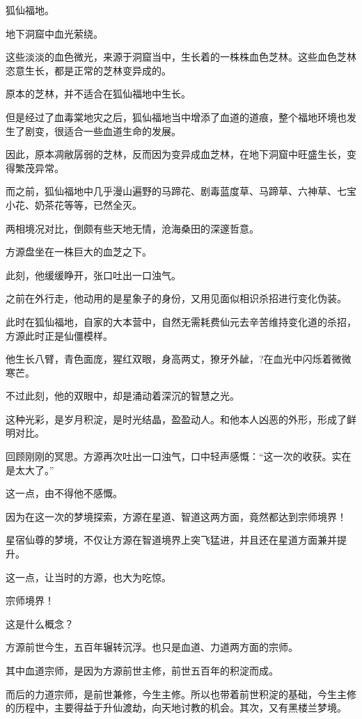 
\begin{this_body}

狐仙福地。

地下洞窟中血光萦绕。

这些淡淡的血色微光，来源于洞窟当中，生长着的一株株血色芝林。这些血色芝林恣意生长，都是正常的芝林变异成的。

原本的芝林，并不适合在狐仙福地中生长。

但是经过了血毒棠地灾之后，狐仙福地当中增添了血道的道痕，整个福地环境也发生了剧变，很适合一些血道生命的发展。

因此，原本凋敝孱弱的芝林，反而因为变异成血芝林，在地下洞窟中旺盛生长，变得繁茂异常。

而之前，狐仙福地中几乎漫山遍野的马蹄花、剧毒蓝度草、马蹄草、六神草、七宝小花、奶茶花等等，已然全灭。

两相境况对比，倒颇有些天地无情，沧海桑田的深邃哲意。

方源盘坐在一株巨大的血芝之下。

此刻，他缓缓睁开，张口吐出一口浊气。

之前在外行走，他动用的是星象子的身份，又用见面似相识杀招进行变化伪装。

此时在狐仙福地，自家的大本营中，自然无需耗费仙元去辛苦维持变化道的杀招，方源此时正是仙僵模样。

他生长八臂，青色面庞，猩红双眼，身高两丈，獠牙外龇，?在血光中闪烁着微微寒芒。

不过此刻，他的双眼中，却是涌动着深沉的智慧之光。

这种光彩，是岁月积淀，是时光结晶，盈盈动人。和他本人凶恶的外形，形成了鲜明对比。

回顾刚刚的冥思。方源再次吐出一口浊气，口中轻声感慨：“这一次的收获。实在是太大了。”

这一点，由不得他不感慨。

因为在这一次的梦境探索，方源在星道、智道这两方面，竟然都达到宗师境界！

星宿仙尊的梦境，不仅让方源在智道境界上突飞猛进，并且还在星道方面兼并提升。

这一点，让当时的方源，也大为吃惊。

宗师境界！

这是什么概念？

方源前世今生，五百年辗转沉浮。也只是血道、力道两方面的宗师。

其中血道宗师，是因为方源前世主修，前世五百年的积淀而成。

而后的力道宗师，是前世兼修，今生主修。所以也带着前世积淀的基础，今生主修的历程中，主要得益于升仙渡劫，向天地讨教的机会。其次，又有黑楼兰梦境。


\end{this_body}
